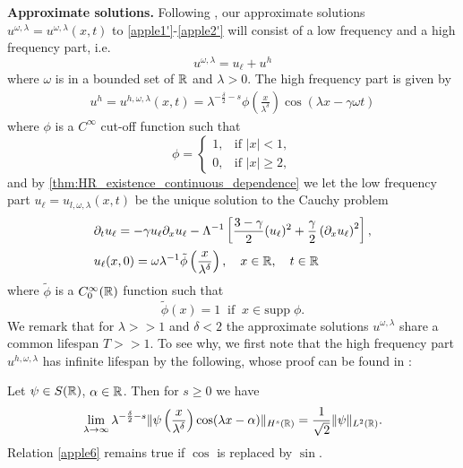 \textbf{Approximate solutions.}
Following \cite{Himonas:2009fk}, our approximate solutions
\\ $u^{\omega, \lambda} = u^{\omega,
\lambda}(x,t)$ to \eqref{apple1'}-\eqref{apple2'} will
consist of a low frequency and a high frequency part,
i.e.
%
%
%
%
\begin{equation}
\label{apple1}
u^{\omega,\lambda} = u_\ell + u^h
\end{equation}
%
%
%
%
where $\omega$ is in a bounded set of $\mathbb{R}$ and $\lambda > 0$. The high frequency part is given by 
%
%
%
%
\begin{equation}
\begin{split}
u^h = u^{h,\omega,\lambda}(x,t) =
\lambda^{-\frac{\delta}{2} -s}
\phi \left (\frac{x}{\lambda^\delta}\right )
\cos(\lambda x - \gamma \omega t)
\end{split}
\end{equation}
%
%
%
%
where $\phi$ is a $C^\infty$ cut-off function such that
%
%
%
%
\begin{equation*}
\phi = \begin{cases}
1, &\text{if $|x|<1$,} \\
0, &\text{if $|x| \ge 2,$} \end{cases}
\end{equation*}
%
%
%
%
and by \cref{thm:HR_existence_continuous_dependence} 
we let the low frequency part $u_\ell = u_{l,
\omega, \lambda}(x,t)$ be the unique solution to the Cauchy problem
%
%
\begin{align}
\label{u-l-apple1'}
& \partial_t u_\ell = -\gamma u_\ell \partial_x u_\ell -
\Lambda^{-1} \left[ \frac{3-\gamma}{2}(u_\ell)^2 +
\frac{\gamma}{2} \left( \partial_x u_\ell \right)^2
\right],
\\
& u_\ell(x,0) = \omega \lambda^{-1} \tilde{\phi} \left(
\frac{x}{\lambda^{\delta}}
\right), \quad x \in \mathbb{R}, \quad t \in \mathbb{R}
\label{apple1**}
\end{align}
%
%
%
%
where $\tilde{\phi}$ is a $C^{\infty}_0(\mathbb{R})$ function such that
%
%
%
%
\begin{equation}
\label{apple1***}
\tilde{\phi}(x) = 1 \; \;  \text{if} \; \;
x \in \text{supp} \; \phi.
\end{equation}
%
%
%
%
We remark that for $\lambda >>1$ and $\delta < 2$ the approximate solutions 
$u^{\omega, \lambda}$ share a common lifespan $T >> 1$. To see why, we 
first note that the high frequency part $u^{h, \omega, \lambda}$ has 
infinite lifespan by the following, whose 
proof can be found in \cite{Himonas:2009fk}: 
%
%
\begin{lemma}
\label{applea}
Let $\psi \in S(\mathbb{R})$, $\alpha \in \mathbb{R}$. Then for $s \ge 0$ we have
%
%
\begin{equation}
\begin{split}
\lim_{\lambda \to \infty} \lambda^{-\frac{\delta}{2}-s}
\|\psi \left( \frac{x}{\lambda^\delta} \right)\cos(\lambda
x - \alpha) \|_{H^s(\mathbb{R})} = \frac{1}{\sqrt
2}\|\psi\|_{L^2(\mathbb{R})}.
\label{apple6}
\end{split}
\end{equation}
%
%
Relation \eqref{apple6} remains true if $\cos$ is
replaced by $\sin$.
\end{lemma}
